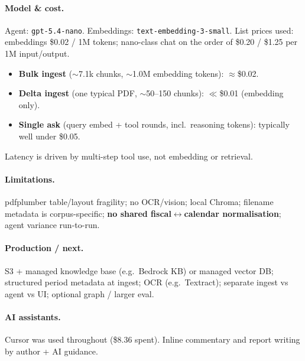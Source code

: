 \documentclass[11pt,a4paper]{article}
\begin{document}
\paragraph{Model \& cost.}
Agent: \texttt{gpt-5.4-nano}. Embeddings: \texttt{text-embedding-3-small}. List prices used: embeddings \$0.02 / 1M tokens; nano-class chat on the order of \$0.20 / \$1.25 per 1M input/output.
\begin{itemize}
  \item \textbf{Bulk ingest} ($\sim$7.1k chunks, $\sim$1.0M embedding tokens): $\approx$\$0.02.
  \item \textbf{Delta ingest} (one typical PDF, $\sim$50--150 chunks): $\ll$\$0.01 (embedding only).
  \item \textbf{Single ask} (query embed + tool rounds, incl.\ reasoning tokens): typically well under \$0.05.
\end{itemize}
Latency is driven by multi-step tool use, not embedding or retrieval.

\paragraph{Limitations.}
pdfplumber table/layout fragility; no OCR/vision; local Chroma; filename metadata is corpus-specific; \textbf{no shared fiscal$\leftrightarrow$calendar normalisation}; agent variance run-to-run.

\paragraph{Production / next.}
S3 + managed knowledge base (e.g.\ Bedrock KB) or managed vector DB; structured period metadata at ingest; OCR (e.g.\ Textract); separate ingest vs agent vs UI; optional graph / larger eval.

\paragraph{AI assistants.}
Cursor was used throughout (\$8.36 spent). Inline commentary and report writing by author + AI guidance.
\end{document}

